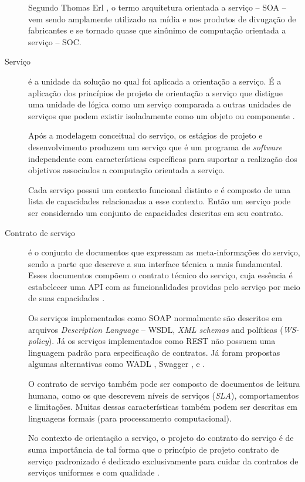 \begin{description}
Segundo Thomas Erl \cite{erl2009web}, o termo arquitetura orientada a serviço --
SOA -- vem sendo amplamente utilizado na mídia e nos produtos de divugação de
fabricantes e se tornado quase que sinônimo de computação orientada a
serviço -- SOC.

\item [Serviço] é a unidade da solução no qual foi aplicada a orientação a
serviço. É a aplicação dos princípios de projeto de orientação a
serviço que distigue uma unidade de lógica como um serviço comparada a outras
unidades de serviços que podem existir isoladamente como um objeto ou
componente \cite{erl2009web}.

Após a modelagem conceitual do serviço, os estágios de projeto e desenvolvimento
produzem um serviço que é um programa de \textit{software} independente com
características específicas para suportar a realização dos objetivos associados
a computação orientada a serviço.

Cada serviço possui um contexto funcional distinto e é composto de uma lista
de capacidades relacionadas a esse contexto. Então um serviço pode ser
considerado um conjunto de capacidades descritas em seu contrato.


\item [Contrato de serviço] é o conjunto de documentos que expressam as
meta-informações do serviço, sendo a parte que descreve a
sua interface técnica a mais fundamental. Esses documentos compõem o contrato
técnico do serviço, cuja essência é estabelecer uma API com as funcionalidades providas pelo serviço por meio de
suas capacidades \cite{erl2009web}.

Os serviços implementados como \ws{} SOAP normalmente são descritos em
arquivos \ws{} \textit{Description Language} -- WSDL, \textit{XML
schemas} and políticas (\textit{WS-policy}). Já os serviços implementados como \ws{} REST não
possuem uma linguagem padrão para especificação de contratos. Já foram propostas
algumas alternativas como WADL \cite{hadley2006web}, Swagger \cite{swaggerSite},
e \neoidl{} \cite{lima2015neoidl}.

O contrato de serviço também pode ser composto de documentos de leitura humana,
como os que descrevem níveis de serviços (\textit{SLA}), comportamentos e
limitações. Muitas dessas características também podem ser descritas em
linguagens formais (para processamento computacional).

No contexto de orientação a serviço, o projeto do contrato do serviço é de suma
importância de tal forma que o princípio de projeto contrato de serviço
padronizado é dedicado exclusivamente para cuidar da contratos de serviços
uniformes e com qualidade \cite{erl2009web}.

\end{description}


